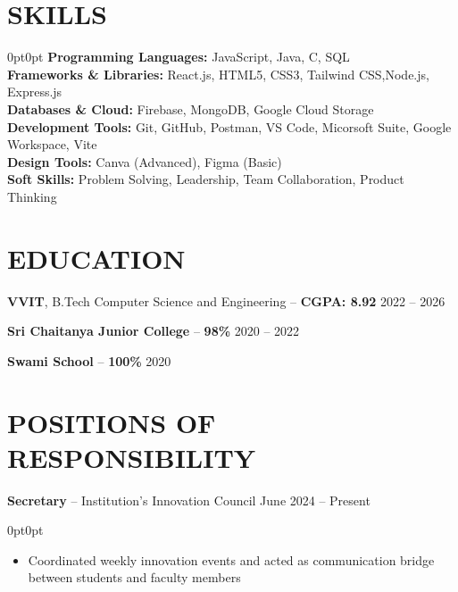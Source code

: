 \documentclass[9pt,letterpaper]{article}
\newenvironment{onecolentry}{\begin{adjustwidth}{0pt}{0pt}}{\end{adjustwidth}}
\newenvironment{highlights}{
    \begin{itemize}[
        topsep=0.05cm,
        parsep=0.05cm,
        partopsep=0pt,
        itemsep=0pt,
        leftmargin=8pt
    ]
}{\end{itemize}}
\begin{document}
\section{SKILLS}
\begin{onecolentry}
\textbf{Programming Languages:} JavaScript, Java, C, SQL \\
\textbf{Frameworks & Libraries:} React.js, HTML5, CSS3, Tailwind CSS,Node.js, Express.js \\
\textbf{Databases \& Cloud:} Firebase, MongoDB, Google Cloud Storage \\
\textbf{Development Tools:} Git, GitHub, Postman, VS Code, Micorsoft Suite, Google Workspace, Vite \\
\textbf{Design Tools:} Canva (Advanced), Figma (Basic) \\
\textbf{Soft Skills:} Problem Solving, Leadership, Team Collaboration, Product Thinking
\end{onecolentry}

\section{EDUCATION}

\noindent
\textbf{VVIT}, B.Tech Computer Science and Engineering -- \textbf{CGPA: 8.92} \hfill 2022 -- 2026

\vspace{0.1cm}

\noindent
\textbf{Sri Chaitanya Junior College} -- \textbf{98\%} \hfill 2020 -- 2022

\vspace{0.1cm}

\noindent
\textbf{Swami School} -- \textbf{100\%} \hfill 2020

\section{POSITIONS OF RESPONSIBILITY}

\noindent
\textbf{Secretary} -- Institution's Innovation Council \hfill June 2024 -- Present
\vspace{0.05cm}
\begin{onecolentry}
\begin{highlights}
    \item Coordinated weekly innovation events and acted as communication bridge between students and faculty members
\end{highlights}
\end{onecolentry}
\end{document}
